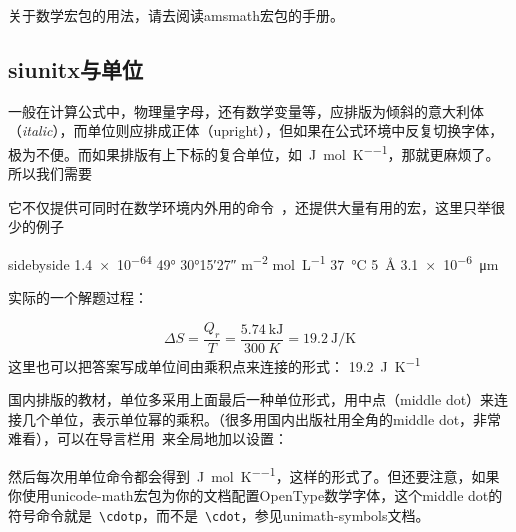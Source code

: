 \documentclass[a4paper,UTF8,zihao = -4]{ctexart} %
\begin{document}
关于数学宏包的用法，请去阅读\textsf{amsmath}宏包的手册。


\subsection{\textsf{siunitx}与单位}
\label{sec:unitPkg}

一般在计算公式中，物理量字母，还有数学变量等，应排版为倾斜的意大利体（\textit{italic}），而单位则应排成正体（upright），但如果在公式环境中反复切换字体，极为不便。而如果排版有上下标的复合单位，如~\si{\joule\per\mole\per\kelvin}，那就更麻烦了。所以我们需要

\begin{dispListing}
\usepackage{siunitx} %
\end{dispListing}
它不仅提供可同时在数学环境内外用的命令~，还提供大量有用的宏，这里只举很少的例子

\begin{dispExample*}{sidebyside}
\num{1.4e-64}\quad
\ang{49}\quad
\ang{30;15;27}\quad
\si{m^{-2}}\quad
\si{\mole\per\liter}\quad
\SI{37}{\celsius}\quad
\SI{5}{\angstrom}\quad
\SI{3.1e-6}{\micro\meter}
\end{dispExample*}

实际的一个解题过程：

\begin{dispExample}
\[
  \Delta S = \dfrac{Q_r}{T} = \dfrac{\SI{5.74}{\kilo\joule}}{\SI{300}{K}} = \SI{19.2}{\joule\per\kelvin}
\]
这里也可以把答案写成单位间由乘积点来连接的形式：
\SI[inter-unit-product = \ensuremath{{}\cdot{}}]{19.2}{\joule\per\kelvin}
\end{dispExample}

国内排版的教材，单位多采用上面最后一种单位形式，用中点（middle dot）来连接几个单位，表示单位幂的乘积。（很多用国内出版社用全角的middle dot，非常难看），可以在导言栏用~来全局地加以设置：

\begin{dispListing}
\usepackage{situnix} %
\end{dispListing}

然后每次用单位命令都会得到~\si[inter-unit-product = \ensuremath{{}\cdot{}}]{\joule\per\mole\per\kelvin}，这样的形式了。但还要注意，如果你使用\textsf{unicode-math}宏包为你的文档配置OpenType数学字体，这个middle dot的符号命令就是~\verb|\cdotp|，而不是~\verb|\cdot|，参见\textsf{unimath-symbols}文档。
\end{document}

